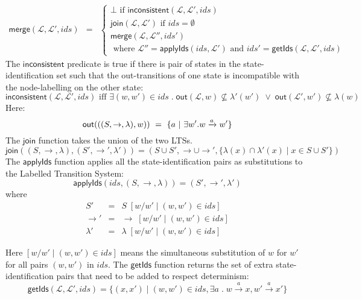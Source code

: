 \begin{eqnarray*}
  \mathsf{merge}(\mathcal{L}, \mathcal{L}', ids) 
     & = & 
  \begin{cases}
    \bot \text{ if } \mathsf{inconsistent}(\mathcal{L}, \mathcal{L}', ids)  \\
    \mathsf{join}(\mathcal{L}, \mathcal{L}') \text{ if } ids = \emptyset  \\
    \mathsf{merge}(\mathcal{L}, \mathcal{L}'', ids')  \\
    \text{ where }  \mathcal{L}'' = \mathsf{applyIds}(ids, \mathcal{L}') \text{ and } ids' = \mathsf{getIds}(\mathcal{L}, \mathcal{L}', ids)
  \end{cases}
\end{eqnarray*}
The $\mathsf{inconsistent}$ predicate is true if there is pair of states in the state-identification set such that the out-transitions of one state is incompatible with the node-labelling on the other state:
\[
\mathsf{inconsistent}(\mathcal{L}, \mathcal{L}', ids) \text{ iff } \exists (w,w') \in ids \; . \; \mathsf{out}(\mathcal{L},w) \nsubseteq \lambda'(w') \; \lor \; \mathsf{out}(\mathcal{L}',w') \nsubseteq \lambda(w)
\]
 \NI Here:
\[
  \mathsf{out}(((S,\rightarrow,\lambda),w)) 
     \ =\  \{ a \ | \  \exists w' . w \xrightarrow{a} w'\} 
\]
The $\mathsf{join}$ function takes the union of the two LTSs.
\[
\mathsf{join}((S, \rightarrow,\lambda), (S', \rightarrow', \lambda')) = (S \cup S', \rightarrow \cup \rightarrow', \{\lambda(x) \cap \lambda'(x) \; | \; x \in S \cup S'\})
\]
The $\mathsf{applyIds}$ function applies all the state-identification pairs as substitutions to the Labelled Transition System:
\[
\mathsf{applyIds}(ids, (S, \rightarrow, \lambda)) = (S', \rightarrow', \lambda')
\]
where
\begin{eqnarray*}
S' & = & S \; [ w / w' \; | \; (w,w') \in ids] \\
\rightarrow' & = & \rightarrow \; [ w / w' \; | \; (w,w') \in ids] \\
\lambda' & = & \lambda \; [ w / w' \; | \; (w,w') \in ids]
\end{eqnarray*}

\NI Here $[ w / w' \; | \; (w,w') \in ids]$ means the simultaneous
substitution of $w$ for $w'$ for all pairs $(w, w')$ in $ids$.  The
$\mathsf{getIds}$ function returns the set of extra
state-identification pairs that need to be added to respect
determinism:
\[
\mathsf{getIds}(\mathcal{L}, \mathcal{L}', ids) = \{(x,x') \; | \; (w,w') \in ids, \exists a \; . \; w \xrightarrow{a} x, w' \xrightarrow{a} x'\}
\]

